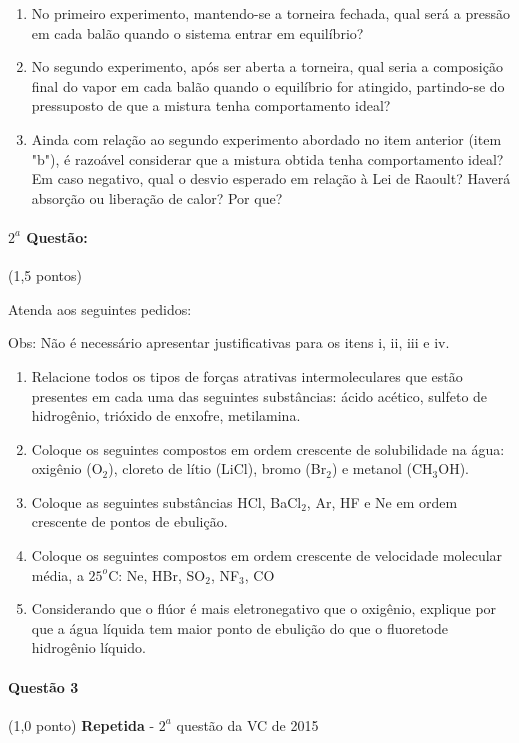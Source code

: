 \documentclass[12pt,a4paper]{article}
\begin{document}
\begin{enumerate}[label=\alph*]
\item No primeiro experimento, mantendo-se a torneira fechada, qual será a pressão em cada balão quando o sistema entrar em equilíbrio?
\item No segundo experimento, após ser aberta a torneira, qual seria a composição final do vapor em cada balão quando o equilíbrio for atingido, partindo-se do pressuposto de que a mistura tenha comportamento ideal?
\item Ainda com relação ao segundo experimento abordado no item anterior (item "b"), é razoável considerar que a mistura obtida tenha comportamento ideal? Em caso negativo, qual o desvio esperado em relação à Lei de Raoult? Haverá 
absorção ou liberação de calor? Por que?
\end{enumerate}

\paragraph{$2^a$ Questão:} (1,5 pontos)

Atenda aos seguintes pedidos:

Obs: Não é necessário apresentar justificativas para os itens i, ii, iii e iv.

\begin{enumerate}[label=\roman*]
\item Relacione todos os tipos de forças atrativas intermoleculares que estão presentes em cada uma das seguintes substâncias: ácido acético, sulfeto de hidrogênio, trióxido de enxofre, metilamina. 
\item Coloque os seguintes compostos em ordem crescente de solubilidade na água: oxigênio (O$_2$), cloreto de lítio (LiCl), bromo (Br$_2$) e metanol (CH$_3$OH).
\item Coloque as seguintes substâncias HCl, BaCl$_2$, Ar, HF e Ne em ordem crescente de pontos de ebulição.
\item Coloque os seguintes compostos em ordem crescente de velocidade molecular média, a $25^o$C: Ne, HBr, SO$_2$, NF$_3$, CO
\item Considerando que o flúor é mais eletronegativo que o oxigênio, explique por que a água líquida tem maior ponto de ebulição do que o fluoretode hidrogênio líquido.
\end{enumerate}

\paragraph{Questão 3} (1,0 ponto) \textbf{Repetida} - $2^a$ questão da VC de 2015
\end{document}
